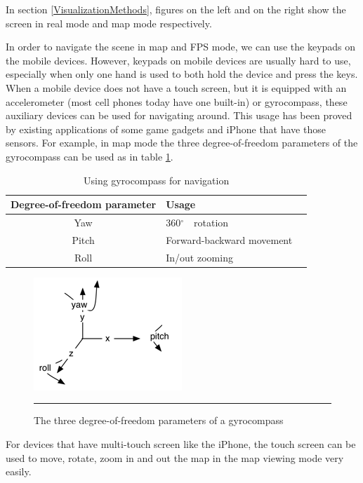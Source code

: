 In section \ref{VisualizationMethods}, figures on the left and on the right show the screen in real mode and map mode respectively.

In order to navigate the scene in map and FPS mode, we can use the keypads on the mobile devices. However, keypads on mobile devices are usually hard to use, especially when only one hand is used to both hold the device and press the keys. When a mobile device does not have a touch screen, but it is equipped with an accelerometer (most cell phones today have one built-in) or gyrocompass, these auxiliary devices can be used for navigating around. This usage has been proved by existing applications of some game gadgets and iPhone that have those sensors. For example, in map mode the three degree-of-freedom parameters of the gyrocompass can be used as in table \ref{tb:GyrocompassNavigation}.

\begin{table}[tb]
	\begin{center}
		\caption{Using gyrocompass for navigation}
		\label{tb:GyrocompassNavigation}
		\begin{tabular}{|c|l|l|}
			\hline
			Degree-of-freedom parameter & Usage                     \\
			\hline
			Yaw                         & 360$^\circ$　rotation      \\
			Pitch                       & Forward-backward movement \\
			Roll                        & In/out zooming            \\
			\hline
		\end{tabular}
	\end{center}
\end{table}

\begin{figure}[htbp]
	\centering
	\includegraphics{./Primitives/yaw_pitch_roll.png}
	\rule{35em}{0.5pt}
	\caption[The three degree-of-freedom parameters of a gyrocompass]{The three degree-of-freedom parameters of a gyrocompass}
	\label{fig:YawPitchRoll}
\end{figure}

For devices that have multi-touch screen like the iPhone, the touch screen can be used to move, rotate, zoom in and out the map in the map viewing mode very easily.
